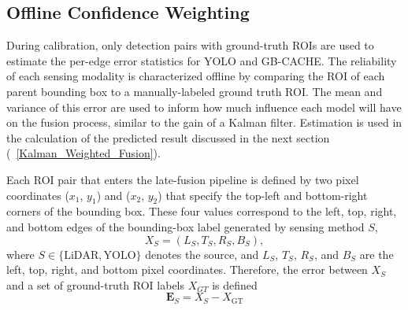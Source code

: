\documentclass{erauthesis}
\begin{document}

\subsection{Offline Confidence Weighting}
During calibration, only detection pairs with ground-truth ROIs are used to estimate the per-edge error statistics for YOLO and GB-CACHE. 
The reliability of each sensing modality is characterized offline by comparing the ROI of each parent bounding box to a manually-labeled ground truth ROI. The mean and variance of this error are used to inform how much influence each model will have on the fusion process, similar to the gain of a Kalman filter. 
Estimation is used in the calculation of the predicted result discussed in the next section (~\ref{Kalman_Weighted_Fusion}).

Each ROI pair that enters the late-fusion pipeline is defined by two pixel coordinates ($x_1$, $y_1$) and ($x_2$, $y_2$) that specify the top-left and bottom-right corners of the bounding box.
These  four values correspond to the left, top, right, and bottom edges of the bounding-box label generated by sensing method $S$,
\begin{equation}
X_{S} = (L_{S}, T_{S}, R_{S}, B_{S}),
\end{equation}
where $S \in \{\text{LiDAR}, \text{YOLO}\}$ denotes the source, and 
$L_S$, $T_S$, $R_S$, and $B_S$ are the left, top, right, and bottom pixel coordinates. 
Therefore, the error between $X_{S}$ and a set of ground-truth ROI labels $X_{GT}$ is defined
\begin{equation}
\mathbf{E}_{S} = X_{S} - X_{\text{GT}}
\end{equation}
\end{document}
